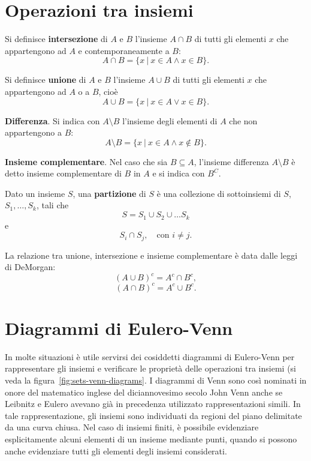 \documentclass[
]{memoir}
\theoremstyle{definition}
\theoremstyle{definition}
\theoremstyle{definition}
\theoremstyle{definition}
\theoremstyle{remark}
\begin{document}
\hypertarget{operazioni-tra-insiemi}{%
\section{Operazioni tra insiemi}\label{operazioni-tra-insiemi}}

Si definisce \textbf{intersezione} di \(A\) e \(B\) l'insieme \(A \cap B\) di tutti
gli elementi \(x\) che appartengono ad \(A\) e contemporaneamente a \(B\):
\[A \cap B = \{x ~\vert~ x \in A \land x \in B\}.\]

Si definisce \textbf{unione} di \(A\) e \(B\) l'insieme \(A \cup B\) di tutti gli
elementi \(x\) che appartengono ad \(A\) o a \(B\), cioè
\[
A \cup B = \{x ~\vert~ x \in A \lor x \in B\}.
\]

\textbf{Differenza}. Si indica con \(A \setminus B\) l'insieme degli elementi di
\(A\) che non appartengono a \(B\):
\[A \setminus B = \{x ~\vert~ x \in A \land x \notin B\}.\]

\textbf{Insieme complementare}. Nel caso che sia \(B \subseteq A\), l'insieme
differenza \(A \setminus B\) è detto insieme complementare di \(B\) in \(A\) e
si indica con \(B^C\).

Dato un insieme \(S\), una \textbf{partizione} di \(S\) è una collezione di
sottoinsiemi di \(S\), \(S_1, \dots, S_k\), tali che
\[S = S_1 \cup S_2 \cup \dots S_k\] e
\[S_i \cap S_j, \quad \text{con~} i \neq j.\]

La relazione tra unione, intersezione e insieme complementare è data
dalle leggi di DeMorgan: \[(A \cup B)^c = A^c \cap B^c,\]
\[(A \cap B)^c = A^c \cup B^c.\]

\hypertarget{diagrammi-di-eulero-venn}{%
\section{Diagrammi di Eulero-Venn}\label{diagrammi-di-eulero-venn}}

In molte situazioni è utile servirsi dei cosiddetti diagrammi di
Eulero-Venn per rappresentare gli insiemi e verificare le proprietà
delle operazioni tra insiemi (si veda la figura~\ref{fig:sets-venn-diagrams}.
I diagrammi di Venn sono così nominati in onore del matematico inglese del diciannovesimo secolo John Venn anche se Leibnitz e Eulero avevano già in precedenza utilizzato rappresentazioni simili.
In tale rappresentazione, gli insiemi sono individuati da regioni del piano delimitate da una curva chiusa. Nel caso di insiemi finiti, è possibile evidenziare esplicitamente alcuni elementi di un insieme mediante punti, quando si
possono anche evidenziare tutti gli elementi degli insiemi considerati.
\end{document}

